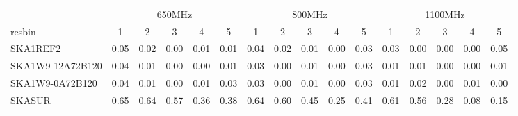 \begin{table}[!htp]
{{\begin{tabular}{|lccccc||ccccc||ccccc|}
 \tabularnewline \cline{2-16} \multicolumn{1}{c}{ } & \multicolumn{5}{|c}{650MHz}  & \multicolumn{5}{c}{800MHz}  & \multicolumn{5}{c|}{1100MHz} \tabularnewline \cline{1-16} 
 resbin  &1 & 2 & 3 & 4 & 5 & 1 & 2 & 3 & 4 & 5 & 1 & 2 & 3 & 4 & 5 \tabularnewline \hline
SKA1REF2 & 0.05 \cellcolor{blue!18.69} & 0.02 \cellcolor{red!18.67} & 0.00 \cellcolor{green!18.00} & 0.01 \cellcolor{orange!19.17} & 0.01 \cellcolor{purple!18.00} & 0.04 \cellcolor{blue!18.69} & 0.02 \cellcolor{red!19.40} & 0.01 \cellcolor{green!18.00} & 0.00 \cellcolor{orange!18.00} & 0.03 \cellcolor{purple!18.00} & 0.03 \cellcolor{blue!19.40} & 0.00 \cellcolor{red!18.00} & 0.00 \cellcolor{green!18.00} & 0.00 \cellcolor{orange!18.00} & 0.05 \cellcolor{purple!32.00}\\ \hline 
SKA1W9-12A72B120 & 0.04 \cellcolor{blue!18.00} & 0.01 \cellcolor{red!18.00} & 0.00 \cellcolor{green!18.00} & 0.00 \cellcolor{orange!18.00} & 0.01 \cellcolor{purple!18.00} & 0.03 \cellcolor{blue!18.00} & 0.00 \cellcolor{red!18.00} & 0.01 \cellcolor{green!18.00} & 0.00 \cellcolor{orange!18.00} & 0.03 \cellcolor{purple!18.00} & 0.01 \cellcolor{blue!18.00} & 0.01 \cellcolor{red!18.75} & 0.00 \cellcolor{green!18.00} & 0.00 \cellcolor{orange!18.00} & 0.01 \cellcolor{purple!20.80}\\ \hline 
SKA1W9-0A72B120 & 0.04 \cellcolor{blue!18.00} & 0.01 \cellcolor{red!18.00} & 0.00 \cellcolor{green!18.00} & 0.01 \cellcolor{orange!19.17} & 0.03 \cellcolor{purple!20.27} & 0.03 \cellcolor{blue!18.00} & 0.00 \cellcolor{red!18.00} & 0.01 \cellcolor{green!18.00} & 0.00 \cellcolor{orange!18.00} & 0.03 \cellcolor{purple!18.00} & 0.01 \cellcolor{blue!18.00} & 0.02 \cellcolor{red!19.50} & 0.00 \cellcolor{green!18.00} & 0.01 \cellcolor{orange!23.25} & 0.00 \cellcolor{purple!18.00}\\ \hline 
SKASUR & 0.65 \cellcolor{blue!60.00} & 0.64 \cellcolor{red!60.00} & 0.57 \cellcolor{green!60.00} & 0.36 \cellcolor{orange!60.00} & 0.38 \cellcolor{purple!60.00} & 0.64 \cellcolor{blue!60.00} & 0.60 \cellcolor{red!60.00} & 0.45 \cellcolor{green!60.00} & 0.25 \cellcolor{orange!60.00} & 0.41 \cellcolor{purple!60.00} & 0.61 \cellcolor{blue!60.00} & 0.56 \cellcolor{red!60.00} & 0.28 \cellcolor{green!60.00} & 0.08 \cellcolor{orange!60.00} & 0.15 \cellcolor{purple!60.00}\tabularnewline \hline 
\end{tabular}}\hfil 
{}}
\end{table}
